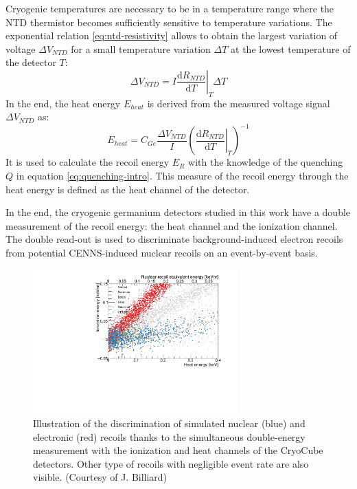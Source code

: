 Cryogenic temperatures are necessary to be in a temperature range where the NTD thermistor becomes sufficiently sensitive to temperature variations. The exponential relation \ref{eq:ntd-resistivity} allows to obtain the largest variation of voltage $\Delta V_{NTD}$ for a small temperature variation $\Delta T$ at the lowest temperature of the detector $T$:
\begin{equation}
\Delta V_{NTD} = 
I
\left. \frac{\mathrm{d}R_{NTD}}{\mathrm{d}T} \right|_{T}
\Delta T
\end{equation}
In the end, the heat energy $E_{heat}$ is derived from the measured voltage signal $\Delta V_{NTD}$ as:
\begin{equation}
E_{heat} = C_{Ge} \frac{\Delta V_{NTD}}{I}
\left( \left. \frac{\mathrm{d}R_{NTD}}{\mathrm{d}T} \right|_{T} \right)^{-1}
\end{equation}
It is used to calculate the recoil energy $E_R$ with the knowledge of the quenching $Q$ in equation \ref{eq:quenching-intro}. This measure of the recoil energy through the heat energy is defined as the heat channel of the detector.

In the end, the cryogenic germanium detectors studied in this work have a double measurement of the recoil energy: the heat channel and the ionization channel. The double read-out is used to discriminate background-induced electron recoils from potential CENNS-induced nuclear recoils on an event-by-event basis.

\begin{figure}
\centering
\includegraphics [width=0.7\textwidth]{Figures/Experiment/discrimination_simulation.pdf}
\caption{Illustration of the discrimination of simulated nuclear (blue) and electronic (red) recoils thanks to the simultaneous double-energy measurement with the ionization and heat channels  of the CryoCube detectors. Other type of recoils with negligible event rate are also visible. (Courtesy of J. Billiard)}
\label{fig:discrimination-simulation}
\end{figure}


